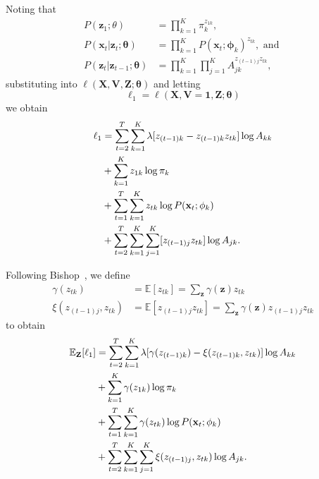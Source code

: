 \documentclass[letterpaper]{article}
\begin{document}
Noting that 
\begin{align*}
    P(\mathbf{z}_{1}; \theta) &= \prod_{k=1}^{K}\pi_{k}^{z_{1k}}, \\
    P(\mathbf{x}_t|\mathbf{z}_t; \mathbf{\theta}) &= \prod_{k=1}^{K} P(\mathbf{x}_t ; \mathbf{\phi}_k)^{z_{tk}},\text{ and }\\ 
    P(\mathbf{z}_t|\mathbf{z}_{t-1}; \mathbf{\theta}) &= \prod_{k=1}^{K}\prod_{j=1}^{K}A_{jk}^{z_{(t-1)j}z_{tk}},
\end{align*}
substituting into $\ell(\mathbf{X}, \mathbf{V}, \mathbf{Z} ; \mathbf{\theta})$ and letting 
\[
    \ell_1 = \ell(\mathbf{X}, \mathbf{V}=\mathbf{1}, \mathbf{Z} ; \mathbf{\theta})
\]
we obtain
\begin{align*}
    \ell_1
    &= \sum^{T}_{t=2}\sum^{K}_{k=1}\lambda[z_{(t-1)k} - z_{(t-1)k}z_{tk}]\log A_{kk} \notag\\
    &+ \sum_{k=1}^{K}{z_{1k}}\log \pi_{k} \notag\\
    &+ \sum_{t=1}^{T}\sum_{k=1}^{K} z_{tk}\log P(\mathbf{x}_t ; \mathbf{\phi}_k) \notag\\
    &+ \sum_{t=2}^{T}\sum_{k=1}^{K}\sum_{j=1}^{K}[z_{(t-1)j}z_{tk}]\log A_{jk}.
\end{align*}

Following Bishop~\cite{bishop2007pattern}, we define
\begin{align*}
    \gamma(z_{tk}) &= \mathbb{E}[z_{tk}] = \sum_{\mathbf{z}}\gamma(\mathbf{z})z_{tk} \\
    \xi(z_{(t-1)j}, z_{tk}) &= \mathbb{E}[z_{(t-1)j}z_{tk}] = \sum_{\mathbf{z}}\gamma(\mathbf{z})z_{(t-1)j}z_{tk}
\end{align*}
to obtain
\begin{align}\label{eq:main}
    \mathbb{E}_{\mathbf{Z}}[\ell_1]
    &= \sum^{T}_{t=2}\sum^{K}_{k=1}\lambda[\gamma(z_{(t-1)k})-\xi(z_{(t-1)k}, z_{tk})]\log A_{kk} \notag\\
    &+ \sum_{k=1}^{K}\gamma(z_{1k})\log \pi_{k} \notag\\
    &+ \sum_{t=1}^{T}\sum_{k=1}^{K} \gamma(z_{tk})\log P(\mathbf{x}_t ; \mathbf{\phi}_k) \notag\\
    &+ \sum_{t=2}^{T}\sum_{k=1}^{K}\sum_{j=1}^{K}\xi(z_{(t-1)j}, z_{tk})\log A_{jk}.
\end{align}
\end{document}
